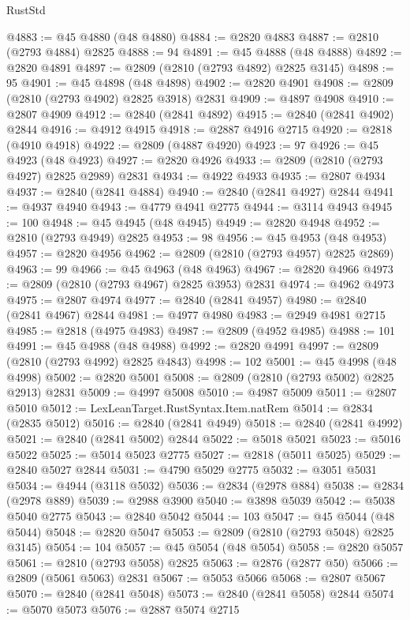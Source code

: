 \begin{lexlean}{RustStd}
\begin{coremodule}
@4883 := @45 @4880 (@48 @4880)
@4884 := @2820 @4883
@4887 := @2810 (@2793 @4884) @2825
@4888 := 94
@4891 := @45 @4888 (@48 @4888)
@4892 := @2820 @4891
@4897 := @2809 (@2810 (@2793 @4892) @2825 @3145)
@4898 := 95
@4901 := @45 @4898 (@48 @4898)
@4902 := @2820 @4901
@4908 := @2809 (@2810 (@2793 @4902) @2825 @3918) @2831
@4909 := @4897 @4908
@4910 := @2807 @4909
@4912 := @2840 (@2841 @4892)
@4915 := @2840 (@2841 @4902) @2844
@4916 := @4912 @4915
@4918 := @2887 @4916 @2715
@4920 := @2818 (@4910 @4918)
@4922 := @2809 (@4887 @4920)
@4923 := 97
@4926 := @45 @4923 (@48 @4923)
@4927 := @2820 @4926
@4933 := @2809 (@2810 (@2793 @4927) @2825 @2989) @2831
@4934 := @4922 @4933
@4935 := @2807 @4934
@4937 := @2840 (@2841 @4884)
@4940 := @2840 (@2841 @4927) @2844
@4941 := @4937 @4940
@4943 := @4779 @4941 @2775
@4944 := @3114 @4943
@4945 := 100
@4948 := @45 @4945 (@48 @4945)
@4949 := @2820 @4948
@4952 := @2810 (@2793 @4949) @2825
@4953 := 98
@4956 := @45 @4953 (@48 @4953)
@4957 := @2820 @4956
@4962 := @2809 (@2810 (@2793 @4957) @2825 @2869)
@4963 := 99
@4966 := @45 @4963 (@48 @4963)
@4967 := @2820 @4966
@4973 := @2809 (@2810 (@2793 @4967) @2825 @3953) @2831
@4974 := @4962 @4973
@4975 := @2807 @4974
@4977 := @2840 (@2841 @4957)
@4980 := @2840 (@2841 @4967) @2844
@4981 := @4977 @4980
@4983 := @2949 @4981 @2715
@4985 := @2818 (@4975 @4983)
@4987 := @2809 (@4952 @4985)
@4988 := 101
@4991 := @45 @4988 (@48 @4988)
@4992 := @2820 @4991
@4997 := @2809 (@2810 (@2793 @4992) @2825 @4843)
@4998 := 102
@5001 := @45 @4998 (@48 @4998)
@5002 := @2820 @5001
@5008 := @2809 (@2810 (@2793 @5002) @2825 @2913) @2831
@5009 := @4997 @5008
@5010 := @4987 @5009
@5011 := @2807 @5010
@5012 := LexLeanTarget.RustSyntax.Item.natRem
@5014 := @2834 (@2835 @5012)
@5016 := @2840 (@2841 @4949)
@5018 := @2840 (@2841 @4992)
@5021 := @2840 (@2841 @5002) @2844
@5022 := @5018 @5021
@5023 := @5016 @5022
@5025 := @5014 @5023 @2775
@5027 := @2818 (@5011 @5025)
@5029 := @2840 @5027 @2844
@5031 := @4790 @5029 @2775
@5032 := @3051 @5031
@5034 := @4944 (@3118 @5032)
@5036 := @2834 (@2978 @884)
@5038 := @2834 (@2978 @889)
@5039 := @2988 @3900
@5040 := @3898 @5039
@5042 := @5038 @5040 @2775
@5043 := @2840 @5042
@5044 := 103
@5047 := @45 @5044 (@48 @5044)
@5048 := @2820 @5047
@5053 := @2809 (@2810 (@2793 @5048) @2825 @3145)
@5054 := 104
@5057 := @45 @5054 (@48 @5054)
@5058 := @2820 @5057
@5061 := @2810 (@2793 @5058) @2825
@5063 := @2876 (@2877 @50)
@5066 := @2809 (@5061 @5063) @2831
@5067 := @5053 @5066
@5068 := @2807 @5067
@5070 := @2840 (@2841 @5048)
@5073 := @2840 (@2841 @5058) @2844
@5074 := @5070 @5073
@5076 := @2887 @5074 @2715

\end{coremodule}
\end{lexlean}
